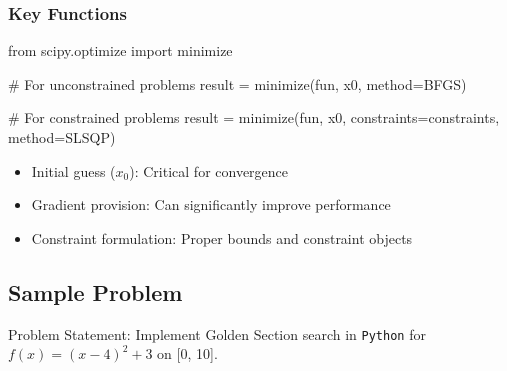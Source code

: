 \documentclass[
  letterpaper,
  DIV=11,
  numbers=noendperiod]{scrreprt}
\newenvironment{Shaded}{\begin{snugshade}}{\end{snugshade}}
\newcommand{\CommentTok}[1]{\textcolor[rgb]{0.37,0.37,0.37}{#1}}
\newcommand{\ImportTok}[1]{\textcolor[rgb]{0.00,0.46,0.62}{#1}}
\newcommand{\NormalTok}[1]{\textcolor[rgb]{0.00,0.23,0.31}{#1}}
\newcommand{\OperatorTok}[1]{\textcolor[rgb]{0.37,0.37,0.37}{#1}}
\newcommand{\StringTok}[1]{\textcolor[rgb]{0.13,0.47,0.30}{#1}}
\begin{document}
\subsubsection{Key Functions}\label{key-functions}

\begin{Shaded}
\begin{Highlighting}[]
\ImportTok{from}\NormalTok{ scipy.optimize }\ImportTok{import}\NormalTok{ minimize}

\CommentTok{\# For unconstrained problems}
\NormalTok{result }\OperatorTok{=}\NormalTok{ minimize(fun, x0, method}\OperatorTok{=}\StringTok{\textquotesingle{}BFGS\textquotesingle{}}\NormalTok{)}

\CommentTok{\# For constrained problems  }
\NormalTok{result }\OperatorTok{=}\NormalTok{ minimize(fun, x0, constraints}\OperatorTok{=}\NormalTok{constraints, method}\OperatorTok{=}\StringTok{\textquotesingle{}SLSQP\textquotesingle{}}\NormalTok{)}
\end{Highlighting}
\end{Shaded}

\begin{tcolorbox}[enhanced jigsaw, leftrule=.75mm, rightrule=.15mm, colback=white, colbacktitle=quarto-callout-note-color!10!white, arc=.35mm, opacityback=0, toptitle=1mm, bottomrule=.15mm, bottomtitle=1mm, titlerule=0mm, title=\textcolor{quarto-callout-note-color}{\faInfo}\hspace{0.5em}{Practical Considerations}, toprule=.15mm, left=2mm, coltitle=black, breakable, colframe=quarto-callout-note-color-frame, opacitybacktitle=0.6]

\begin{itemize}
\item
  Initial guess (\(x_0\)): Critical for convergence
\item
  Gradient provision: Can significantly improve performance
\item
  Constraint formulation: Proper bounds and constraint objects
\end{itemize}

\end{tcolorbox}

\subsection{Sample Problem}\label{sample-problem-6}

Problem Statement: Implement Golden Section search in \texttt{Python}
for \(f(x)=(x−4)^2+3\) on {[}0, 10{]}.
\end{document}
